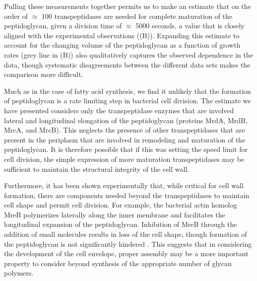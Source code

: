 Pulling these measurements together permits us to make an estimate that on the
order of $\approx$ 100 transpeptidases are needed for complete maturation of the
peptidoglycan, given a division time of $\approx$ 5000 seconds, a value that is
closely aligned with the experimental observations ((B)). Expanding this
estimate to account for the changing volume of the peptidoglycan as a function
of growth rates (grey line in (B)) also qualitatively captures the observed
dependence in the data, though systematic disagreements between the different
data sets makes the comparison more difficult. 

Much as in the case of fatty acid synthesis, we find it unlikely that the
formation of peptidoglycan is a rate limiting step in bacterial cell division.
The estimate we have presented considers only the transpeptidase enzymes that
are involved lateral and longitudinal elongation of the peptidoglycan (proteins
MrdA, MrdB, MrcA, and MrcB). This neglects the presence of other transpeptidases
that are present in the periplasm that are involved in remodeling and maturation
of the peptidoglycan. It is therefore possible that if this was setting the
speed limit for cell division, the simple expression of more maturation
transpeptidases may be sufficient to maintain the structural integrity of the
cell wall. 

Furthermore, it has been shown experimentally that, while critical for cell
wall formation, there are components needed beyond  the transpeptidases to
maintain cell shape and permit cell division. For example, the bacterial actin
homolog MreB polymerizes laterally along the inner membrane and facilitates the
longitudinal expansion of the peptidoglycan. Inhibition of MreB through the
addition of small molecules results in loss of the cell shape, though formation
of the peptidoglycan is not significantly hindered \cite{shi2018}. This suggests
that in considering the development of the cell envelope, proper assembly may
be a more important property to consider beyond synthesis of the appropriate
number of glycan polymers. 